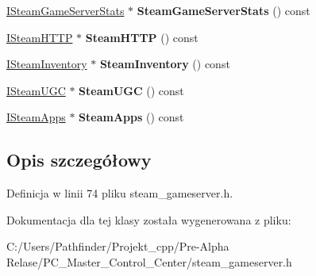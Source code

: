 \begin{DoxyCompactItemize}
\hyperlink{class_i_steam_game_server_stats}{I\+Steam\+Game\+Server\+Stats} $\ast$ {\bfseries Steam\+Game\+Server\+Stats} () const
\item 
\mbox{\label{class_c_steam_game_server_a_p_i_context_ac87225c9cde28fb37969d9e410aa51e8}} 
\hyperlink{class_i_steam_h_t_t_p}{I\+Steam\+H\+T\+TP} $\ast$ {\bfseries Steam\+H\+T\+TP} () const
\item 
\mbox{\label{class_c_steam_game_server_a_p_i_context_a513b725211308e88ece2f3a3ad0f8adc}} 
\hyperlink{class_i_steam_inventory}{I\+Steam\+Inventory} $\ast$ {\bfseries Steam\+Inventory} () const
\item 
\mbox{\label{class_c_steam_game_server_a_p_i_context_a231fa4209939ef7350972c68ba0f1d00}} 
\hyperlink{class_i_steam_u_g_c}{I\+Steam\+U\+GC} $\ast$ {\bfseries Steam\+U\+GC} () const
\item 
\mbox{\label{class_c_steam_game_server_a_p_i_context_ac63942cb24bd1adb681f4abdb9971248}} 
\hyperlink{class_i_steam_apps}{I\+Steam\+Apps} $\ast$ {\bfseries Steam\+Apps} () const
\end{DoxyCompactItemize}


\subsection{Opis szczegółowy}


Definicja w linii 74 pliku steam\+\_\+gameserver.\+h.



Dokumentacja dla tej klasy została wygenerowana z pliku\+:\begin{DoxyCompactItemize}
\item 
C\+:/\+Users/\+Pathfinder/\+Projekt\+\_\+cpp/\+Pre-\/\+Alpha Relase/\+P\+C\+\_\+\+Master\+\_\+\+Control\+\_\+\+Center/steam\+\_\+gameserver.\+h\end{DoxyCompactItemize}
